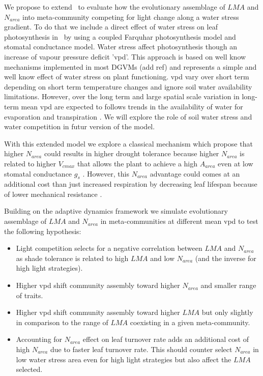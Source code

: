 \documentclass[a4paper,11pt]{article}
\begin{document}
We propose to extend \plant\ to evaluate how the evolutionary assemblage of $LMA$ and $N_{area}$ into meta-community competing for light change along a water stress gradient. To do that we include a direct effect of water stress on leaf photosynthesis in \plant\ by using a coupled Farquhar photosynthesis model and stomatal conductance model. Water stress affect photosynthesis though an increase of vapour pressure deficit 'vpd'. This approach
is based on well know mechanisms implemented in most DGVMs (add ref) and represents a simple and well know effect of water stress on plant functioning. vpd vary over short term depending on short term temperature changes and ignore soil water availability limitations. However, over the long term and large spatial scale variation in long-term mean vpd are expected to follows trends in the availability of water for evaporation and transpiration \citep{Prentice-2014}. We will explore the role of soil water stress and water competition in futur version of the model.

With this extended model we explore a classical mechanism which propose that higher $N_{area}$ could results in higher drought tolerance because higher $N_{area}$ is related to higher $V_{cmax}$ that allows the
plant to achieve a high $A_{area}$ even at low stomatal conductance
$g_s$ \citep{Wright-2003}. However, this $N_{area}$ advantage could comes at an additional cost than just increased respiration by decreasing leaf lifespan because of lower mechanical resistance \citep{Wright-2002a}.

Building on the adaptive dynamics framework we simulate evolutionary assemblage of $LMA$ and $N_{area}$ in meta-communities at different mean vpd to test the following hypothesis:  
 
\begin{itemize}

\item Light competition selects for a negative correlation between $LMA$ and $N_{area}$ as shade tolerance is related to high $LMA$ and low $N_{area}$ (and the inverse for high light strategies).

\item Higher vpd shift community assembly toward higher $N_{area}$ and smaller range of traits.

\item Higher vpd shift community assembly toward higher $LMA$ but only slightly in comparison to the range of $LMA$ coexisting in a given meta-community.

\item Accounting for $N_{area}$ effect on leaf turnover rate adds an additional cost of high $N_{area}$ due to faster leaf turnover rate. This should counter select $N_{area}$ in low water stress area even for high light strategies but also affect the $LMA$ selected.

\end{itemize}
\end{document}
